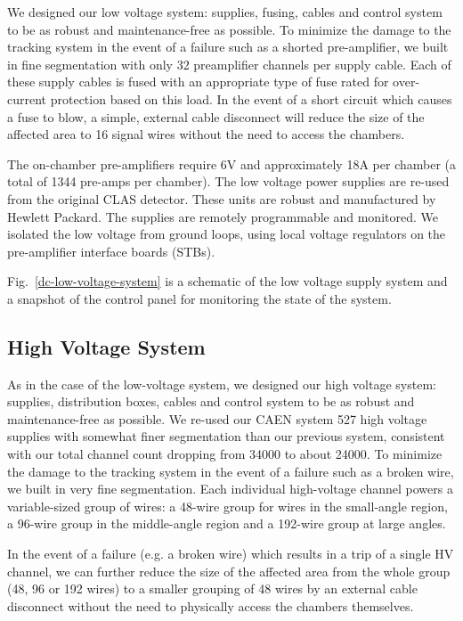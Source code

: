 We designed our low voltage system: supplies, fusing, cables and control
system to be as robust and maintenance-free as possible.  To minimize
the damage to the tracking system in the event of a failure such as
a shorted pre-amplifier, we built in fine segmentation with only
32 preamplifier channels per supply cable.  Each of these supply 
cables is fused with an appropriate type of fuse rated for over-current 
protection based on this load.
In the event of a short circuit which causes a fuse to blow,
a simple, external cable disconnect will reduce the size of the affected
area to 16 signal wires without the need to access the chambers.

The on-chamber pre-amplifiers require 6V and approximately 18A per chamber
(a total of 1344 pre-amps per chamber).
The low voltage power supplies are re-used from the original CLAS detector.  
These units are robust and manufactured by Hewlett Packard.  
The supplies are remotely programmable and monitored.   We 
isolated the low voltage from 
ground loops, using local voltage regulators on the pre-amplifier interface 
boards (STBs).  

Fig.~\ref{dc-low-voltage-system} is a schematic of the low voltage
supply system and a snapshot 
of the control panel for monitoring the state of the system.

\subsection{High Voltage System}

As in the case of the low-voltage system, we designed our high voltage system: 
supplies, distribution boxes, cables and control system to be as robust and 
maintenance-free as possible.  
We re-used our CAEN 
system 527 high voltage supplies with somewhat finer segmentation than our 
previous system, consistent with our total channel count dropping from 34000 
to about 24000.
To minimize the damage to the tracking system in the event of a failure such as
a broken wire, we built in very fine segmentation.
Each individual high-voltage channel powers a variable-sized group of 
wires: a 48-wire group for wires in the small-angle region, a 96-wire group
in the middle-angle region and a 192-wire group at large angles.

In the event of a failure (e.g. a broken wire) which results in a trip
of a single HV channel, we can further reduce the size of the affected
area from the whole group (48, 96 or 192 wires) to a smaller grouping
of 48 wires by an external cable disconnect without the need to 
physically access the chambers themselves.

